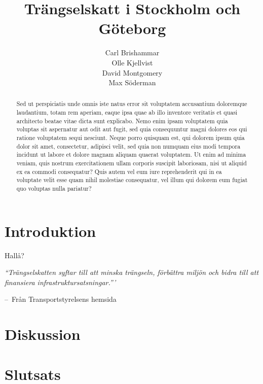 \documentclass{amsart}
\title{Trängselskatt i Stockholm och Göteborg}
\author{Carl Brishammar \\ Olle Kjellvist \\ David Montgomery \\ Max Söderman}
\date{}
\makeatletter
\newenvironment{chapquote}[2][2em]
  {\setlength{\@tempdima}{#1}%
   \def\chapquote@author{#2}%
   \parshape 1 \@tempdima \dimexpr\textwidth-2\@tempdima\relax%
   \itshape}
  {\par\normalfont\hfill--\ \chapquote@author\hspace*{\@tempdima}\par\bigskip}
\makeatother
\begin{document}
\maketitle
\begin{abstract}
	Sed ut perspiciatis unde omnis iste natus error sit voluptatem accusantium doloremque laudantium, totam rem aperiam, eaque ipsa quae ab illo inventore veritatis et quasi architecto beatae vitae dicta sunt explicabo. Nemo enim ipsam voluptatem quia voluptas sit aspernatur aut odit aut fugit, sed quia consequuntur magni dolores eos qui ratione voluptatem sequi nesciunt. Neque porro quisquam est, qui dolorem ipsum quia dolor sit amet, consectetur, adipisci velit, sed quia non numquam eius modi tempora incidunt ut labore et dolore magnam aliquam quaerat voluptatem. Ut enim ad minima veniam, quis nostrum exercitationem ullam corporis suscipit laboriosam, nisi ut aliquid ex ea commodi consequatur? Quis autem vel eum iure reprehenderit qui in ea voluptate velit esse quam nihil molestiae consequatur, vel illum qui dolorem eum fugiat quo voluptas nulla pariatur?
\end{abstract}
\newpage
\tableofcontents
\newpage
\section{Introduktion}

Hallå?

\begin{chapquote}{Från Transportstyrelsens hemsida}
``Trängselskatten syftar till att minska trängseln, förbättra miljön och bidra till att finansiera infrastruktursatsningar.”'
\end{chapquote}





\section{Diskussion}

\section{Slutsats}

\newpage
\printbibliography
\end{document}
